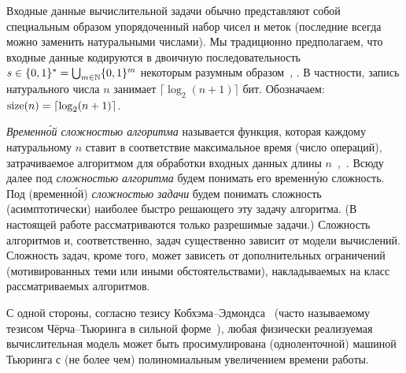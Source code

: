 Входные данные вычислительной задачи обычно представляют
собой специальным образом упорядоченный набор чисел и меток (последние всегда можно заменить натуральными числами).
Мы традиционно предполагаем, что входные данные кодируются в двоичную последовательность $s \in \{0,1\}^* = \bigcup_{m \in \mathbb{N}} \{0,1\}^m$ некоторым разумным образом~\cite[с.~34--38]{Garey:1982}, \cite[p.~2]{Arora:2009}. 
В частности, запись натурального числа $n$ занимает $\lceil\log_2 (n+1)\rceil$ бит.
Обозначаем: $\operatorname{size}(n) = \lceil\log_2 (n+1)\rceil$.
\begin{comment}
Соответственно, $\size(k) = \size(|k|) + 1$ для целого числа~$k$.
Рациональное число $p$ представляется парой взаимно простых чисел $k$ (числитель) и $n$ (знаменатель), где $k \in \Z$, $n \in \N$.
В теоретических исследованиях длина входных данных задачи обычно полагается равной сумме длин соответствующих чисел.
На практике же, чаще всего, длина входных данных пропорциональна произведению количества чисел на длину записи наибольшего из них.
Тем не менее, длина каждой из этих кодировок полиномиальна (в данном случае, не более, чем квадратична) относительно длины другой.
\end{comment}

\emph{Временн\'{о}й сложностью алгоритма} называется функция, 
которая каждому натуральному $n$ ставит в соответствие максимальное время (число операций), затрачиваемое алгоритмом для обработки входных данных длины $n$~\cite[с.~18]{Garey:1982},~\cite[p.~32]{Goldreich:2008}.
Всюду далее под \emph{сложностью алгоритма} будем понимать 
его временн\'{у}ю сложность.
Под (временн\'{о}й) \emph{сложностью задачи} будем понимать сложность (асимптотически) наиболее быстро решающего эту задачу алгоритма.
(В настоящей работе рассматриваются только разрешимые задачи.)
Сложность алгоритмов и, соответственно, задач существенно зависит от модели вычислений. Сложность задач, кроме того, может зависеть от дополнительных ограничений (мотивированных теми или иными обстоятельствами), накладываемых на класс рассматриваемых алгоритмов.

С одной стороны, согласно тезису Кобхэма--Эдмондса~\cite[c.~33]{Goldreich:2008}
(часто называемому тезисом Чёрча--Тьюринга в сильной форме~\cite[c.~26]{Arora:2009}),
любая физически реализуемая вычислительная модель 
может быть просимулирована (одноленточной) машиной Тьюринга
с (не более чем) полиномиальным увеличением времени работы.

